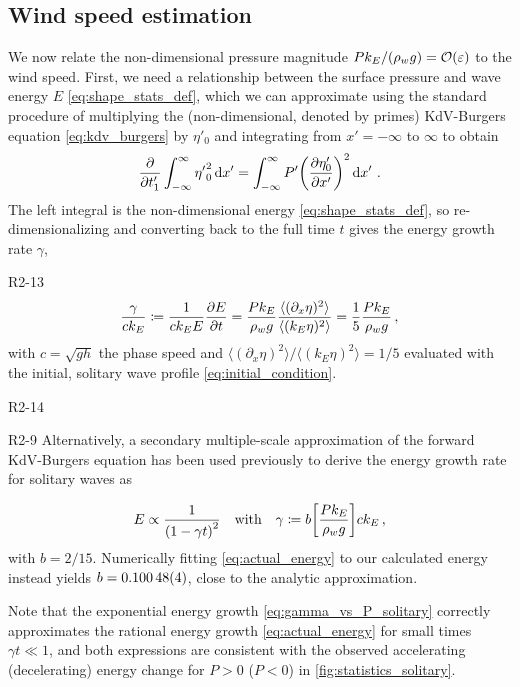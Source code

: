 \documentclass{jfm}
\renewcommand*{\epsilon}{\varepsilon}
\begin{document}
\subsection{\label{sec:press_mag} Wind speed estimation}
We now relate the non-dimensional pressure magnitude $P k_E/(\rho_w g) =
\order{\epsilon}$ to the wind speed.
First, we need a relationship between the surface pressure and wave
energy $E$ \cref{eq:shape_stats_def}, which we can approximate using the
standard procedure \citep[\eg][]{mei2005nonlinear} of multiplying the
(non-dimensional, denoted by primes) KdV-Burgers equation
\cref{eq:kdv_burgers} by $\eta'_0$ and integrating from $x'=-\infty$ to
$\infty$ to obtain
\begin{equation}
  \pdv{t'_1} \int_{-\infty}^{\infty} {\eta'}_0^2 \dd{x'}
  = \int_{-\infty}^{\infty} P' \pqty{\pdv{\eta'_0}{x'}}^2
  \dd{x'} \,.
  \label{eq:energy_nondim}
\end{equation}
The left integral is the non-dimensional energy
\cref{eq:shape_stats_def}, so re-dimensionalizing and converting back to
the full time $t$ gives the energy growth rate $\gamma$,
\begin{LineLabel}{R2-13}
\begin{equation}
  \frac{\gamma}{c k_E} \coloneqq
  \frac{1}{c k_E E} \pdv{E}{t}
  = \frac{P k_E}{\rho_w g} \frac{\langle (\partial_x \eta)^2 \rangle}
    {\langle (k_E \eta)^2 \rangle}
  = \frac{1}{5} \frac{P k_E}{\rho_w g}
  \,,
  \label{eq:gamma_vs_P_solitary}
\end{equation}
with $c = \sqrt{gh}$ the phase speed and $\langle (\partial_x \eta)^2
\rangle / \langle (k_E \eta)^2 \rangle = 1/5$ evaluated with the
initial, solitary wave profile \cref{eq:initial_condition}.
\end{LineLabel}
\begin{LineLabel}{R2-14}
\begin{LineLabel}{R2-9}
Alternatively, a secondary multiple-scale approximation of the
forward KdV-Burgers equation has been used previously to derive
the energy growth rate for solitary waves as~\citep{zdyrski2019effects}
\end{LineLabel}
\begin{equation}
  E \propto \frac{1}{\pqty{1 - \gamma t}^2}
  \qq{with}
  \gamma \coloneqq b \bqty{\frac{P k_E}{\rho_w g}} c k_E
  \,,
  \label{eq:actual_energy}
\end{equation}
with $b = 2/15$.
Numerically fitting \cref{eq:actual_energy} to our calculated energy
instead yields $b = \num{0.10048 \pm 0.00004}$, close to the analytic
approximation.
\end{LineLabel}
Note that the exponential energy growth \cref{eq:gamma_vs_P_solitary}
correctly approximates the rational energy growth
\cref{eq:actual_energy} for small times $\gamma t \ll 1$,
and both expressions are consistent with the observed accelerating
(decelerating) energy change for $P>0$ ($P<0$) in
\cref{fig:statistics_solitary}.
\end{document}
